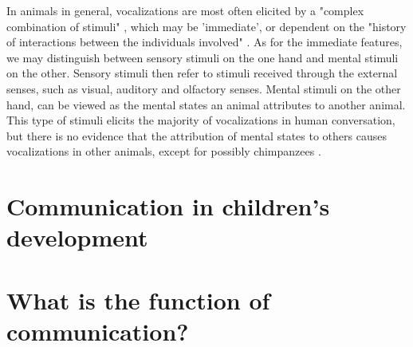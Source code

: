 In animals in general, vocalizations are most often elicited by a "complex combination of stimuli" \citep[p.~150]{SeyfarthCheney03}, which may be 'immediate', or dependent on the "history of interactions between the individuals involved" \citep[p.~151]{SeyfarthCheney03}. As for the immediate features, we may distinguish between sensory stimuli on the one hand and mental stimuli on the other. Sensory stimuli then refer to stimuli received through the external senses, such as visual, auditory and olfactory senses. Mental stimuli on the other hand, can be viewed as the mental states an animal attributes to another animal. This type of stimuli elicits the majority of vocalizations in human conversation, but there is no evidence that the attribution of mental states to others causes vocalizations in other animals, except for possibly chimpanzees \citep{SeyfarthCheney03}.

\section{Communication in children's development}
\label{sec:comm:ontogeny}

\section{What is the function of communication?}
\label{sec:comm:function}
